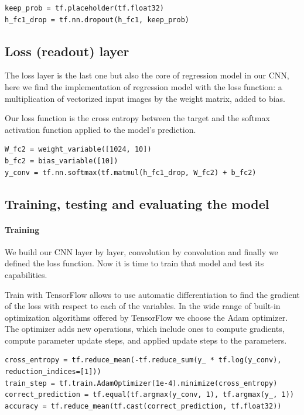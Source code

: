 \begin{lstlisting}
keep_prob = tf.placeholder(tf.float32)
h_fc1_drop = tf.nn.dropout(h_fc1, keep_prob)
\end{lstlisting}

\subsection{Loss (readout) layer}

The loss layer is the last one but also the core of regression model in our \acs{CNN}, here we find the implementation of regression model with the loss function: a multiplication of vectorized input images by the weight matrix, added to bias.

Our loss function is the cross entropy between the target and the softmax activation function applied to the model's prediction.

\begin{lstlisting}
W_fc2 = weight_variable([1024, 10])
b_fc2 = bias_variable([10])
y_conv = tf.nn.softmax(tf.matmul(h_fc1_drop, W_fc2) + b_fc2)
\end{lstlisting}

\subsection{Training, testing and evaluating the model}

\paragraph{Training}

We build our \acs{CNN} layer by layer, convolution by convolution and finally we defined the loss function. Now it is time to train that model and test its capabilities.

Train with TensorFlow allows to use automatic differentiation to find the gradient of the loss with respect to each of the variables. In the wide range of built-in optimization algorithms offered by TensorFlow we choose the Adam optimizer. The optimizer adds new operations, which include ones to compute gradients, compute parameter update steps, and applied update steps to the parameters.

\begin{lstlisting}
cross_entropy = tf.reduce_mean(-tf.reduce_sum(y_ * tf.log(y_conv), reduction_indices=[1]))
train_step = tf.train.AdamOptimizer(1e-4).minimize(cross_entropy)
correct_prediction = tf.equal(tf.argmax(y_conv, 1), tf.argmax(y_, 1))
accuracy = tf.reduce_mean(tf.cast(correct_prediction, tf.float32))
\end{lstlisting}

